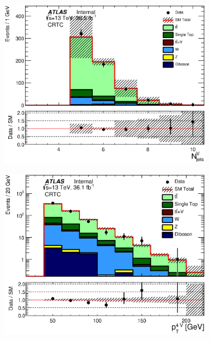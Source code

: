 \begin{figure}[h!]
\begin{subfigure}[b]{0.40\textwidth}
    \includegraphics[width=\textwidth]{figures/ttbar/postfit/CA_NjV_CRTopC}
               \caption{ }
    \end{subfigure}
            \begin{subfigure}[b]{0.40\textwidth}  
    \includegraphics[width=\textwidth]{figures/ttbar/postfit/CA_pTjV4_CRTopC_log}
               \caption{ }
    \end{subfigure}
            \begin{subfigure}[b]{0.40\textwidth}  

\end{subfigure}
\end{figure}

